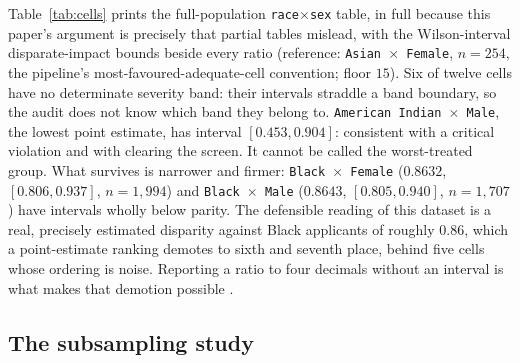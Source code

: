 \documentclass[sigconf,nonacm]{acmart}
\begin{document}
Table~\ref{tab:cells} prints the full-population
\texttt{race}$\times$\texttt{sex} table, in full because this paper's
argument is precisely that partial tables mislead, with the Wilson-interval
disparate-impact bounds beside every ratio (reference: \texttt{Asian $\times$
Female}, $n{=}254$, the pipeline's most-favoured-adequate-cell convention;
floor $15$). Six of twelve cells have no determinate severity band: their
intervals straddle a band boundary, so the audit does not know which band they
belong to. \texttt{American Indian $\times$ Male}, the lowest point estimate,
has interval $[0.453, 0.904]$: consistent with a critical violation and
with clearing the screen. It cannot be called the worst-treated group. What
survives is narrower and firmer: \texttt{Black $\times$ Female} ($0.8632$,
$[0.806, 0.937]$, $n{=}1{,}994$) and \texttt{Black $\times$ Male} ($0.8643$,
$[0.805, 0.940]$, $n{=}1{,}707$) have intervals wholly below parity. The
defensible reading of this dataset is a real, precisely estimated disparity
against Black applicants of roughly $0.86$, which a point-estimate ranking
demotes to sixth and seventh place, behind five cells whose ordering is noise.
Reporting a ratio to four decimals without an interval is what makes that
demotion possible \citep{chen2018}.

\begin{table}[t]
\caption{HMDA \texttt{race}$\times$\texttt{sex}, full population
($10{,}978$), out-of-fold predictions. Reference \texttt{Asian $\times$
Female} ($n{=}254$); conservative Wilson-based DI intervals; ``band det.''
marks cells whose whole interval sits in one severity band. Generated by
\texttt{scripts/interval\_estimates.py}; appendix~\ref{app:cells} repeats this
table under two further reference conventions.}
\label{tab:cells}
\footnotesize

\end{table}

\subsection{The subsampling study}
\label{sec:subsample}
\end{document}
